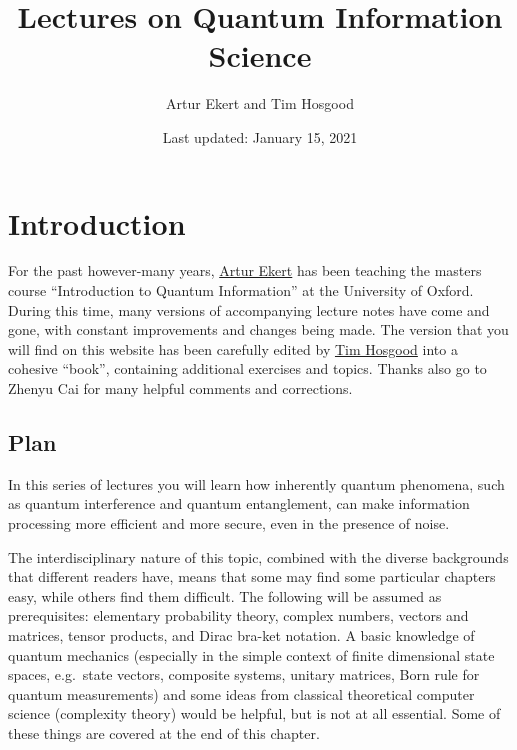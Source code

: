 \documentclass[fleqn]{article}
\title{Lectures on Quantum Information Science}
\author{Artur Ekert and Tim Hosgood}
\date{Last updated: January 15, 2021}
\renewcommand{\leq}{\leqslant}
\renewcommand{\geq}{\geqslant}
\let\oldsection\section
\renewcommand\section{\clearpage\oldsection}
\begin{document}
\setcounter{tocdepth}{2}
\tableofcontents

\providecommand{\xmapsto}[1]{\overset{#1}{\longmapsto}}
\providecommand{\bra}[1]{\langle#1|}
\providecommand{\ket}[1]{|#1\rangle}
\providecommand{\braket}[2]{\langle#1|#2\rangle}
\providecommand{\proj}[1]{|#1\rangle\langle#1|}
\providecommand{\av}[1]{\langle#1\rangle}
\providecommand{\tr}{\operatorname{tr}}
\providecommand{\id}{\mathbf{1}}
\providecommand{\diag}[2]{\begin{bmatrix}#1&0\\0&#2\end{bmatrix}}
\providecommand{\mqty}[1]{\begin{matrix}#1\end{matrix}}
\providecommand{\bmqty}[1]{\begin{bmatrix}#1\end{bmatrix}}
\renewcommand{\leq}{\leqslant}
\renewcommand{\geq}{\geqslant}

\hypertarget{introduction}{%
\section*{Introduction}\label{introduction}}

For the past however-many years, \href{https://www.arturekert.com/}{Artur Ekert} has been teaching the masters course ``Introduction to Quantum Information'' at the University of Oxford.
During this time, many versions of accompanying lecture notes have come and gone, with constant improvements and changes being made.
The version that you will find on this website has been carefully edited by \href{https://thosgood.com}{Tim Hosgood} into a cohesive ``book'', containing additional exercises and topics.
Thanks also go to Zhenyu Cai for many helpful comments and corrections.

\hypertarget{plan}{%
\subsection*{Plan}\label{plan}}

In this series of lectures you will learn how inherently quantum phenomena, such as quantum interference and quantum entanglement, can make information processing more efficient and more secure, even in the presence of noise.

The interdisciplinary nature of this topic, combined with the diverse backgrounds that different readers have, means that some may find some particular chapters easy, while others find them difficult.
The following will be assumed as prerequisites: elementary probability theory, complex numbers, vectors and matrices, tensor products, and Dirac bra-ket notation.
A basic knowledge of quantum mechanics (especially in the simple context of finite dimensional state spaces, e.g.~state vectors, composite systems, unitary matrices, Born rule for quantum measurements) and some ideas from classical theoretical computer science (complexity theory) would be helpful, but is not at all essential.
Some of these things are covered at the end of this chapter.
\end{document}
